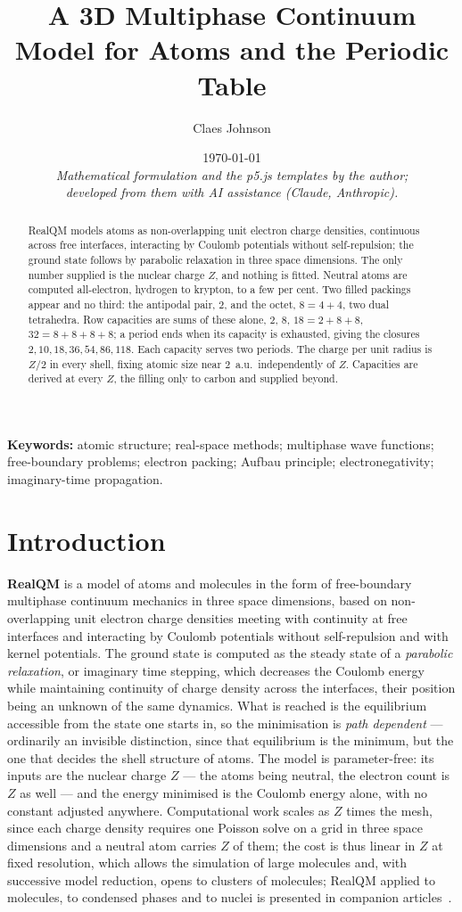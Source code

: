 \documentclass[11pt]{article}
\title{A 3D Multiphase Continuum Model for Atoms and the Periodic Table}
\author[1]{Claes Johnson}
\affil[1]{KTH Royal Institute of Technology, Stockholm, Sweden \\
\texttt{claesjohnson@gmail.com}}
\date{\today \\[0.4em]
\small\textit{Mathematical formulation and the p5.js templates by the author;} \\
\small\textit{developed from them with AI assistance (Claude, Anthropic).}}
\begin{document}
\maketitle

\begin{abstract}
RealQM models atoms as non-overlapping unit electron charge densities, continuous across free
interfaces, interacting by Coulomb potentials without self-repulsion; the ground state follows by
parabolic relaxation in three space dimensions. The only number supplied is the nuclear charge $Z$,
and nothing is fitted. Neutral atoms are computed all-electron, hydrogen to krypton, to a few
per cent. Two filled packings appear and no third: the antipodal pair, $2$, and the octet, $8=4{+}4$, two
dual tetrahedra. Row capacities are sums of these alone, $2$, $8$, $18=2{+}8{+}8$,
$32=8{+}8{+}8{+}8$; a period ends when its capacity is exhausted, giving the closures
$2,10,18,36,54,86,118$. Each capacity serves two periods. The charge
per unit radius is $Z/2$ in every shell, fixing atomic size near $2$~a.u.\ independently of
$Z$. Capacities are derived at every $Z$, the filling only to carbon and supplied beyond.
\end{abstract}

\medskip
\noindent\textbf{Keywords:} atomic structure; real-space methods; multiphase wave
functions; free-boundary problems; electron packing; Aufbau principle;
electronegativity; imaginary-time propagation.

\section{Introduction}\label{sec:intro}

\textbf{RealQM} is a model of atoms and molecules in the form of free-boundary multiphase
continuum mechanics in three space dimensions, based on non-overlapping unit electron charge
densities meeting with continuity at free interfaces and interacting by Coulomb potentials
without self-repulsion and with kernel potentials. The ground
state is computed as the steady state of a \emph{parabolic relaxation}, or imaginary time
stepping, which decreases the Coulomb energy while maintaining continuity of charge density
across the interfaces, their position being an unknown of the same dynamics. What is reached is the equilibrium accessible from the
state one starts in, so the minimisation is \emph{path dependent} --- ordinarily an invisible
distinction, since that equilibrium is the minimum, but the one that decides the shell structure of atoms. The model is parameter-free: its inputs are the
nuclear charge $Z$ --- the atoms being neutral, the electron count is $Z$ as well --- and the energy
minimised is the Coulomb energy alone, with no constant adjusted anywhere. Computational work scales as
$Z$ times the mesh, since each charge density requires one Poisson solve on a grid in three space
dimensions and a neutral atom carries $Z$ of them; the cost is thus linear in $Z$ at fixed
resolution,
which allows the simulation of large molecules and, with successive model reduction, opens to
clusters of molecules; RealQM applied to molecules, to condensed phases and to nuclei is
presented in companion articles~\cite{Johnson-RealQM}.
\end{document}
